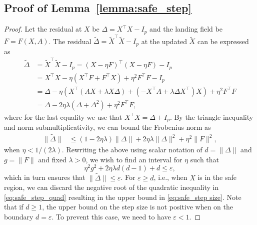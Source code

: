 \documentclass[twoside,11pt]{article}
\newcommand{\revision}[1]{{#1}}
\begin{document}
\subsection{Proof of Lemma~\ref{lemma:safe_step}}
\begin{proof}
    Let the residual at $X$ be $\Delta = X^\top X - I_p$ and the landing field be $F = F(X, A)$. The residual $\tilde \Delta = {\tilde X}^\top {\tilde X} - I_p$ at the updated $\tilde X$ can be expressed as
    \begin{align}
        \tilde \Delta &= {\tilde X}^\top {\tilde X} - I_p = (X - \eta F)^\top (X - \eta F) - I_p \\
        &= X^\top X - \eta (X^\top F + F^\top X ) + \eta^2 F^\top F - I_p\\
        &= \Delta - \eta \left(X^\top (A X + \lambda X \Delta) + (-X^\top A + \lambda \Delta X^\top) X \right) + \eta^2 F^\top F \\
        &= \Delta - 2\eta\lambda (\Delta + \Delta^2) + \eta^2 F^{\top} F,
    \end{align}
    \revision{where for the last equality we use that $X^\top X = \Delta + I_p$}. By the triangle inequality and norm submultiplicativity, we can bound the Frobenius norm as
    \begin{align}
        \| \tilde \Delta \| &\leq (1-2\eta\lambda) \| \Delta \| + 2\eta\lambda\| \Delta \|^2 + \eta^2 \| F \|^2,
    \end{align}
    when $\eta < 1/(2\lambda)$. Rewriting the above using scalar notation of $d = \| \Delta \|$ and $g = \| F \|$ and fixed $\lambda >0$, we wish to find an interval for $\eta$ such that
    \begin{equation}
        \eta^2 g^2 + 2\eta\lambda d (d-1) + d \leq \varepsilon, \label{eq:safe_step_quad}
    \end{equation}
    which in turn ensures that $\| \tilde \Delta \| \leq \varepsilon$. For $\varepsilon \geq d$, i.e., when $X$ is in the safe region, we can discard the negative root of the quadratic inequality in \eqref{eq:safe_step_quad} resulting in the upper bound in \eqref{eq:safe_step size}.
%
    Note that if $d \geq 1$, the upper bound on the step size is not positive when on the boundary $d = \varepsilon$. To prevent this case, we need to have $\varepsilon < 1$.
\end{proof}
\end{document}
